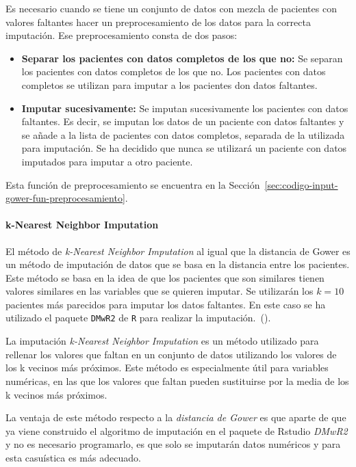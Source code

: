 Es necesario cuando se tiene un conjunto de datos con mezcla de pacientes con valores faltantes hacer un preprocesamiento de los datos para la correcta imputación. Ese preprocesamiento consta de dos pasos: 
\begin{itemize}
    \item \textbf{Separar los pacientes con datos completos de los que no:} Se separan los pacientes con datos completos de los que no. Los pacientes con datos completos se utilizan para imputar a los pacientes don datos faltantes.
    \item \textbf{Imputar sucesivamente:} Se imputan sucesivamente los pacientes con datos faltantes. Es decir, se imputan los datos de un paciente con datos faltantes y se añade a la lista de pacientes con datos completos, separada de la utilizada para imputación. Se ha decidido que nunca se utilizará un paciente con datos imputados para imputar a otro paciente.
\end{itemize}

Esta función de preprocesamiento se encuentra en la Sección~\ref{sec:codigo-input-gower-fun-preprocesamiento}.


\paragraph*{k-Nearest Neighbor Imputation}

El método de \textit{k-Nearest Neighbor Imputation} al igual que la distancia de Gower es un método de imputación de datos que se basa en la distancia entre los pacientes. Este método se basa en la idea de que los pacientes que son similares tienen valores similares en las variables que se quieren imputar. Se utilizarán los $k = 10$ pacientes más parecidos para imputar los datos faltantes. En este caso se ha utilizado el paquete \texttt{DMwR2} de \texttt{R} para realizar la imputación.~(\cite{DMwR2}).

La imputación \textit{k-Nearest Neighbor Imputation} es un método utilizado para rellenar los valores que faltan en un conjunto de datos utilizando los valores de los k vecinos más próximos. Este método es especialmente útil para variables numéricas, en las que los valores que faltan pueden sustituirse por la media de los k vecinos más próximos.

La ventaja de este método respecto a la \textit{distancia de Gower} es que aparte de que ya viene construido el algoritmo de imputación en el paquete de Rstudio \textit{DMwR2} y no es necesario programarlo, es que solo se imputarán datos numéricos y para esta casuística es más adecuado.

